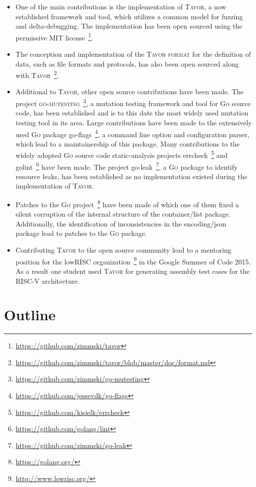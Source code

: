 \begin{itemize}
\item One of the main contributions is the implementation of \textsc{Tavor}, a now established framework and tool, which utilizes a common model for fuzzing and delta-debugging. The implementation has been open sourced using the permissive MIT license~\footnote{\url{https://github.com/zimmski/tavor}}.
\item The conception and implementation of the \textsc{Tavor format} for the definition of data, such as file formats and protocols, has also been open sourced along with \textsc{Tavor}~\footnote{\url{https://github.com/zimmski/tavor/blob/master/doc/format.md}}.
\item Additional to \textsc{Tavor}, other open source contributions have been made. The project \textsc{go-mutesting}~\footnote{\url{https://github.com/zimmski/go-mutesting}}, a mutation testing framework and tool for \textsc{Go} source code, has been established and is to this date the most widely used mutation testing tool in its area. Large contributions have been made to the extensively used \textsc{Go} package go-flags~\footnote{\url{https://github.com/jessevdk/go-flags}}, a command line option and configuration parser, which lead to a maintainership of this package. Many contributions to the widely adopted \textsc{Go} source code static-analysis projects errcheck~\footnote{\url{https://github.com/kisielk/errcheck}} and golint~\footnote{\url{https://github.com/golang/lint}} have been made. The project go-leak~\footnote{\url{https://github.com/zimmski/go-leak}}, a \textsc{Go} package to identify resource leaks, has been established as no implementation existed during the implementation of \textsc{Tavor}.
\item Patches to the \textsc{Go} project~\footnote{\url{https://golang.org/}} have been made of which one of them fixed a silent corruption of the internal structure of the container/list package. Additionally, the identification of inconsistencies in the encoding/json package lead to patches to the \textsc{Go} package.
\item Contributing \textsc{Tavor} to the open source community lead to a mentoring position for the lowRISC organization~\footnote{\url{http://www.lowrisc.org/}} in the Google Summer of Code 2015. As a result one student used \textsc{Tavor} for generating assembly test cases for the RISC-V architecture.
\end{itemize}

\section{Outline}
\label{sec:outline}


